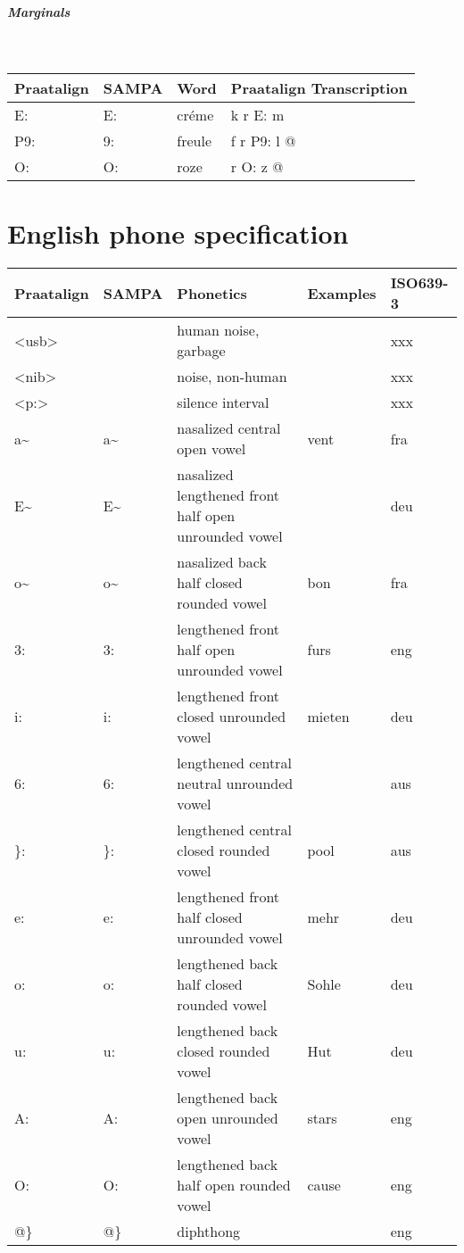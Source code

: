 \subparagraph{Marginals}\strut\\
\begin{tabular}{llll}
	Praatalign & SAMPA & Word & Praatalign Transcription\\
	\hline
	E: & E: & cr\'eme & k r E: m\\
	P9: & 9: & freule & f r P9: l @\\
	O: & O: & roze & r O: z @
\end{tabular}

\newpage
\section{English phone specification}
\label{sec:slenglish}
\begin{longtable}{llp{}ll}
	Praatalign & SAMPA & Phonetics & Examples & ISO639-3\\
	\hline
	\textless usb\textgreater & & human noise, garbage & & xxx\\
	\textless nib\textgreater & & noise, non-human & & xxx\\
	\textless p:\textgreater & & silence interval & & xxx\\
	a\textasciitilde & a\textasciitilde & nasalized central open vowel & vent & fra\\
	E\textasciitilde & E\textasciitilde & nasalized lengthened front half open unrounded vowel & & deu\\
	o\textasciitilde & o\textasciitilde & nasalized back half closed rounded vowel & bon & fra\\
	3: & 3: & lengthened front half open unrounded vowel & furs & eng\\
	i: & i: & lengthened front closed unrounded vowel & mieten & deu\\
	6: & 6: & lengthened central neutral unrounded vowel & & aus\\
	\}: & \}: & lengthened central closed rounded vowel & pool & aus\\
	e: & e: & lengthened front half closed unrounded vowel & mehr & deu\\
	o: & o: & lengthened back half closed rounded vowel & Sohle & deu\\
	u: & u: & lengthened back closed rounded vowel & Hut & deu\\
	A: & A: & lengthened back open unrounded vowel & stars & eng\\
	O: & O: & lengthened back half open rounded vowel & cause & eng\\
	@\} & @\} & diphthong & & eng\\

\end{longtable}

